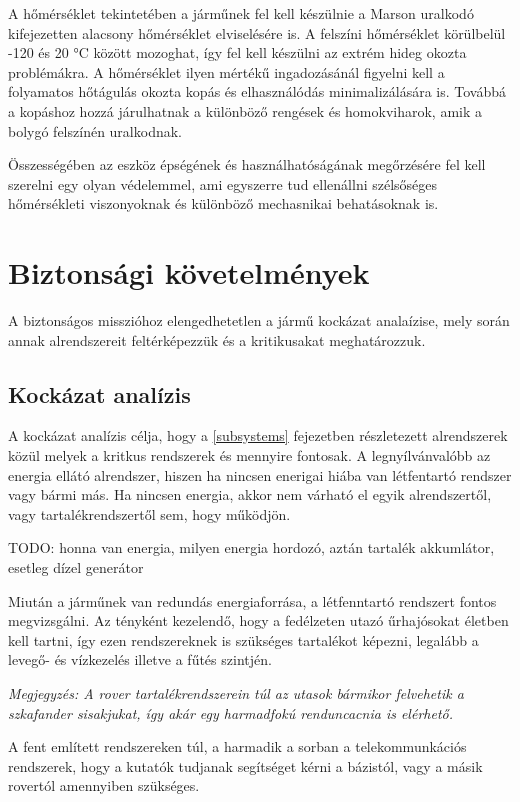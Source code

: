 \documentclass[12pt]{report}
\begin{document}
A hőmérséklet tekintetében a járműnek fel kell készülnie a Marson uralkodó kifejezetten alacsony hőmérséklet elviselésére is. A felszíni hőmérséklet körülbelül  -120 és 20 °C között mozoghat, így fel kell készülni az extrém hideg okozta problémákra. A hőmérséklet ilyen mértékű ingadozásánál figyelni kell a folyamatos hőtágulás okozta kopás és elhasználódás minimalizálására is. Továbbá a kopáshoz hozzá járulhatnak a különböző rengések és homokviharok, amik a bolygó felszínén uralkodnak.

Összességében az eszköz épségének és használhatóságának megőrzésére fel kell szerelni egy olyan védelemmel, ami egyszerre tud ellenállni szélsőséges hőmérsékleti viszonyoknak és különböző mechasnikai behatásoknak is.

\section{Biztonsági követelmények}

A biztonságos misszióhoz elengedhetetlen a jármű kockázat analaízise, mely során annak alrendszereit feltérképezzük és a kritikusakat meghatározzuk. 

\subsection{Kockázat analízis}



A kockázat analízis célja, hogy a \ref{subsystems} fejezetben részletezett alrendszerek közül melyek a kritkus rendszerek és mennyire fontosak. A legnyílvánvalóbb az energia ellátó alrendszer, hiszen ha nincsen enerigai hiába van létfentartó rendszer vagy bármi más. Ha nincsen energia, akkor nem várható el egyik alrendszertől, vagy tartalékrendszertől sem, hogy működjön.

TODO: honna van energia, milyen energia hordozó, aztán tartalék akkumlátor, esetleg dízel generátor

Miután a járműnek van redundás energiaforrása, a létfenntartó rendszert fontos megvizsgálni. Az tényként kezelendő, hogy a fedélzeten utazó űrhajósokat életben kell tartni, így ezen rendszereknek is szükséges tartalékot képezni, legalább a levegő- és vízkezelés illetve a fűtés szintjén. 

\textit{Megjegyzés: A rover tartalékrendszerein túl az utasok bármikor felvehetik a szkafander sisakjukat, így akár egy harmadfokú renduncacnia is elérhető.}

A fent említett rendszereken túl, a harmadik a sorban a telekommunkációs rendszerek, hogy a kutatók tudjanak segítséget kérni a bázistól, vagy a másik rovertól amennyiben szükséges.
\end{document}
